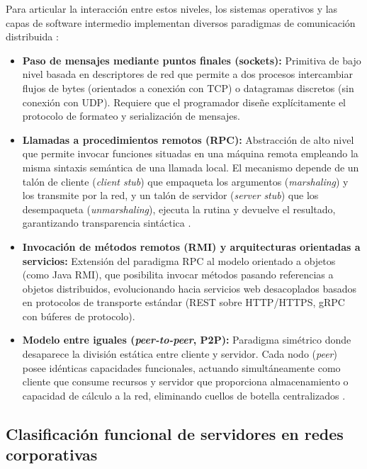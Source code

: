 \documentclass[12pt]{article}
\begin{document}
Para articular la interacción entre estos niveles, los sistemas operativos y las capas de software intermedio implementan diversos paradigmas de comunicación distribuida \parencite[\S 17.3, pp.\ 788--793]{deitel2004operating}:
\begin{itemize}[noitemsep, topsep=2pt, parsep=0pt]
    \item \textbf{Paso de mensajes mediante puntos finales (sockets):} Primitiva de bajo nivel basada en descriptores de red que permite a dos procesos intercambiar flujos de bytes (orientados a conexión con TCP) o datagramas discretos (sin conexión con UDP). Requiere que el programador diseñe explícitamente el protocolo de formateo y serialización de mensajes.
    \item \textbf{Llamadas a procedimientos remotos (RPC):} Abstracción de alto nivel que permite invocar funciones situadas en una máquina remota empleando la misma sintaxis semántica de una llamada local. El mecanismo depende de un talón de cliente (\textit{client stub}) que empaqueta los argumentos (\textit{marshaling}) y los transmite por la red, y un talón de servidor (\textit{server stub}) que los desempaqueta (\textit{unmarshaling}), ejecuta la rutina y devuelve el resultado, garantizando transparencia sintáctica \parencite[\S 18.3, pp.\ 18-16--18-18]{stallings2018operating}.
    \item \textbf{Invocación de métodos remotos (RMI) y arquitecturas orientadas a servicios:} Extensión del paradigma RPC al modelo orientado a objetos (como Java RMI), que posibilita invocar métodos pasando referencias a objetos distribuidos, evolucionando hacia servicios web desacoplados basados en protocolos de transporte estándar (REST sobre HTTP/HTTPS, gRPC con búferes de protocolo).
    \item \textbf{Modelo entre iguales (\textit{peer-to-peer}, P2P):} Paradigma simétrico donde desaparece la división estática entre cliente y servidor. Cada nodo (\textit{peer}) posee idénticas capacidades funcionales, actuando simultáneamente como cliente que consume recursos y servidor que proporciona almacenamiento o capacidad de cálculo a la red, eliminando cuellos de botella centralizados \parencite[\S 1.12, pp.\ 27--28]{silberschatz2006fundamentos}.
\end{itemize}

\subsection{Clasificación funcional de servidores en redes corporativas}
\label{sec:clasificacionFuncionalServidores}
\end{document}
